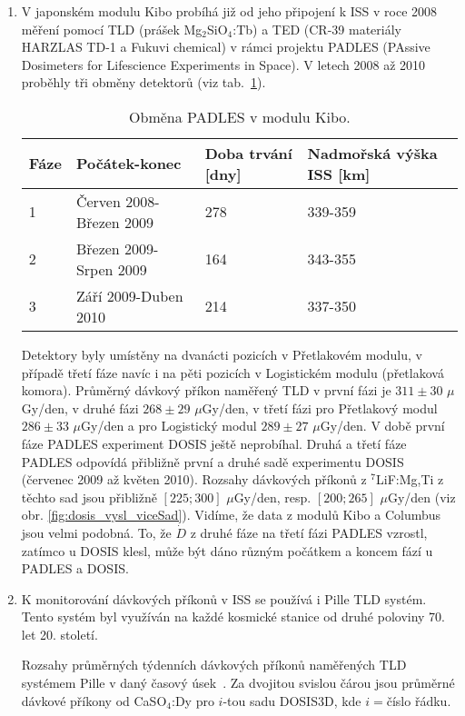 \begin{enumerate}
  \item V japonském modulu Kibo \cite{kibo} probíhá již od jeho připojení k ISS v roce 2008 měření pomocí TLD (prášek Mg$_2$SiO$_4$:Tb) a TED (CR-39 materiály HARZLAS TD-1 a Fukuvi chemical) v rámci projektu PADLES (PAssive Dosimeters for Lifescience Experiments in Space). V letech 2008 až 2010 proběhly tři obměny detektorů (viz tab.~\ref{tab:dosis_kibo}).
	\begin{table}[ht]
	  \centering
	  \caption{Obměna PADLES v modulu Kibo. \cite{japonsky}}
	  \label{tab:dosis_kibo}
	  \begin{tabular}{llll}
		\toprule
	Fáze&Počátek-konec&Doba trvání [dny]&Nadmořská výška ISS [km]\\
	\midrule
	1&Červen 2008-Březen 2009&278&339-359\\
	2&Březen 2009-Srpen 2009&164&343-355\\
	3&Září 2009-Duben 2010&214&337-350\\
	\bottomrule
	  \end{tabular}
	\end{table}
	Detektory byly umístěny na dvanácti pozicích v Přetlakovém modulu, v případě třetí fáze navíc i na pěti pozicích v Logistickém modulu (přetlaková komora). Průměrný dávkový příkon naměřený TLD v první fázi je $311\pm 30$ $\mu$Gy/den, v druhé fázi $268\pm29$ $\mu$Gy/den, v třetí fázi pro Přetlakový modul $286\pm33$ $\mu$Gy/den a pro Logistický modul $289\pm27$ $\mu$Gy/den. V době první fáze PADLES experiment DOSIS ještě neprobíhal. Druhá a třetí fáze PADLES odpovídá přibližně první a druhé sadě experimentu DOSIS (červenec 2009 až květen 2010). Rozsahy dávkových příkonů z $^7$LiF:Mg,Ti z těchto sad jsou přibližně $[225;300]$ $\mu$Gy/den, resp. $[200;265]$ $\mu$Gy/den (viz obr. \ref{fig:dosis_vysl_viceSad}). Vidíme, že data z modulů Kibo a Columbus jsou velmi podobná. To, že $\dot{D}$ z druhé fáze na třetí fázi PADLES
	vzrostl,
	zatímco u DOSIS klesl, může být dáno různým počátkem a koncem fází u PADLES a DOSIS. \cite{japonsky}
  \item K monitorování dávkových příkonů v ISS se používá i Pille TLD systém. Tento systém byl využíván na každé kosmické stanice od druhé poloviny 70. let 20. století.
	\begin{table}[ht]
	  \centering
	  \caption{Rozsahy průměrných týdenních dávkových příkonů naměřených TLD systémem Pille v daný časový úsek~\cite{pille, pille2}. Za dvojitou svislou čárou jsou průměrné dávkové příkony od CaSO$_4$:Dy pro $i$-tou sadu DOSIS3D, kde $i=$číslo řádku.}
	  \label{tab:dosis_pille}

\end{table}
\end{enumerate}

